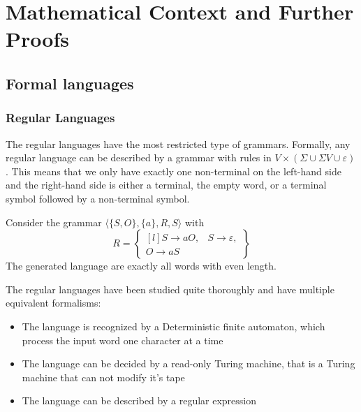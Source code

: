 \chapter{Mathematical Context and Further Proofs}\label{ch:mathematical-context-and-further-proofs} %

\section{Formal languages}\label{sec:formal-languages-app}

\subsection{Regular Languages}\label{subsec:regular-languages}

The regular languages have the most restricted type of grammars.
Formally, any regular language can be described by a grammar with rules in $V\times(\Sigma \cup \Sigma V \cup \varepsilon)$.
This means that we only have exactly one non-terminal on the left-hand side and the right-hand side is either a terminal, the empty word, or a terminal symbol followed by a non-terminal symbol.

\begin{exmp}
    Consider the grammar $\langle \{S, O\}, \{a\}, R, S \rangle$ with
    \[
        R = \begin{Bmatrix*}[l]
                S \to aO,
                &S \to \varepsilon, \\
                O \to aS
        \end{Bmatrix*}
    \]
    The generated language are exactly all words with even length.
\end{exmp}

The regular languages have been studied quite thoroughly and have multiple equivalent formalisms:
\begin{itemize}
    \setlength\itemsep{0.15em}
    \item The language is recognized by a Deterministic finite automaton, which process the input word one character at a time
    \item The language can be decided by a read-only Turing machine, that is a Turing machine that can not modify it's tape
    \item The language can be described by a regular expression
\end{itemize}


